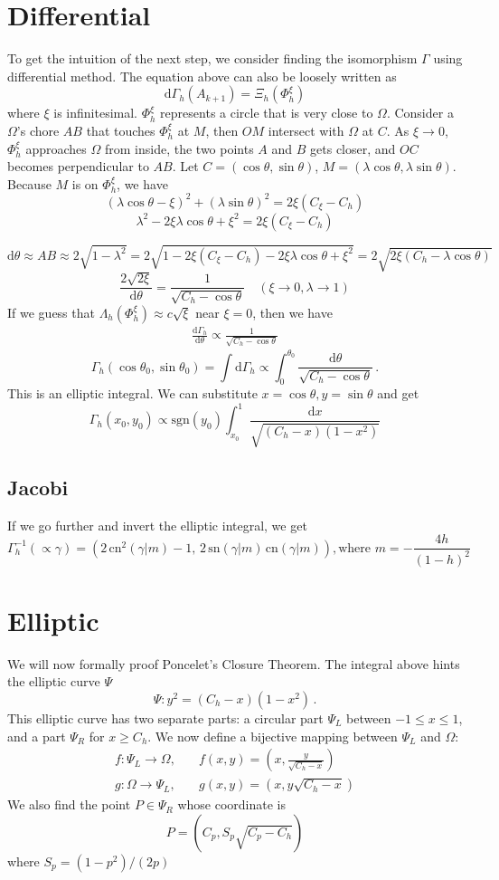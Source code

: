 \documentclass[]{article}
\newcommand{\ud}{\mathrm{d}}
\begin{document}
\section{Differential}
To get the intuition of the next step, we consider finding the isomorphism $\Gamma$ using differential method. The equation above can also be loosely written as
\[
\ud \Gamma_h(A_{k+1}) = \Xi_h(\Phi_h^\xi)
\]
where $\xi$ is infinitesimal. $\Phi_h^\xi$ represents a circle that is very close to $\Omega$. Consider a $\Omega$'s chore $AB$ that touches $\Phi_h^\xi$ at $M$, then $OM$ intersect with $\Omega$ at $C$. As $\xi\to 0$, $\Phi_h^\xi$ approaches $\Omega$ from inside, the two points  $A$ and $B$ gets closer, and $OC$ becomes perpendicular to $AB$. Let $C = (\cos\theta, \sin\theta)$, $M = (\lambda\cos\theta, \lambda\sin\theta)$. Because $M$ is on $\Phi_h^\xi$, we have
\[
(\lambda\cos\theta-\xi)^2 + (\lambda\sin\theta)^2 = 2\xi(C_\xi-C_h)
\]
\[
\lambda^2 - 2\xi\lambda\cos\theta + \xi^2 =  2\xi(C_\xi-C_h)
\]

\[
\ud\theta \approx AB \approx 2\sqrt{1-\lambda^2} = 2\sqrt{1-2\xi(C_\xi-C_h) - 2\xi\lambda\cos\theta + \xi^2} = 2\sqrt{2\xi(C_h - \lambda\cos\theta)}\]
\[
\frac{2\sqrt{2\xi}}{\ud \theta} = \frac{1}{\sqrt{C_h-\cos\theta}}\quad (\xi\to 0, \lambda \to 1)
\]
If we guess that $\Lambda_h(\Phi^\xi_h) \approx c\sqrt{\xi}$ near $\xi = 0$, then we have
\begin{align}
\frac{\ud \Gamma_h}{\ud \theta} \propto \frac{1}{\sqrt{C_h-\cos\theta}} \label{eq:diff}
\end{align}
\[
\Gamma_h(\cos\theta_0, \sin\theta_0) = \int\ud\Gamma_h \propto\int_0^{\theta_0} \frac{\ud\theta}{\sqrt{C_h-\cos\theta}}\,.
\]
This is an elliptic integral. We can substitute $x=\cos\theta, y=\sin\theta$ and get
\[
\Gamma_h(x_0, y_0)\propto\mathrm{sgn}(y_0)\int_{x_0}^{1}\frac{\ud x}{\sqrt{(C_h-x)(1-x^2)}}
\]

\subsection{Jacobi}
If we go further and invert the elliptic integral, we get
\[
\Gamma_h^{-1}(\propto\gamma) = (2\, \mathrm{cn}^2(\gamma|m)-1,\, 2\, \mathrm{sn}(\gamma|m)\, \mathrm{cn}(\gamma|m)),\mbox{where } m = -\frac{4h}{(1-h)^2}
\]

\section{Elliptic}
We will now formally proof Poncelet's Closure Theorem.
The integral above hints the elliptic curve $\Psi$
\[
	\Psi: y^2 = \left(C_h-x\right)(1-x^2)\,.
\]
This elliptic curve has two separate parts: a circular part $\Psi_L$ between $-1\leq x\leq1$, and a part $\Psi_R$ for $x \geq C_h$. We now define a bijective mapping between $\Psi_L$ and $\Omega$:
\begin{align*}
	f: \Psi_L\to\Omega,&\quad f(x, y) = \left(x, \frac{y}{\sqrt{C_h-x}}\right)\\
	g: \Omega\to\Psi_L,&\quad g(x, y) = \left(x, y \sqrt{C_h-x}\right)
\end{align*}
We also find the point $P\in\Psi_R$ whose coordinate is
\[
P = (C_p, S_p \sqrt{C_p-C_h})
\]
where $S_p = (1-p^2)/(2p)$
\end{document}
